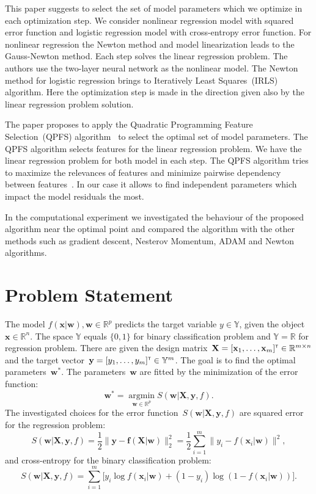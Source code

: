 \documentclass[a4paper,12pt]{article}
\theoremstyle{plain} %
\theoremstyle{definition} %
\theoremstyle{remark} %
\newcommand{\bw}{\mathbf{w}}
\newcommand{\by}{\mathbf{y}}
\newcommand{\bx}{\mathbf{x}}
\newcommand{\bbR}{\mathbb{R}}
\newcommand{\bbY}{\mathbb{Y}}
\newcommand{\bX}{\mathbf{X}}
\newcommand{\T}{{\text{\tiny\sffamily\upshape\mdseries T}}}
\newcommand{\argmin}{\mathop{\arg \min}\limits}
\begin{document}
	This paper suggests to select the set of model parameters which we optimize in each optimization step.
	We consider nonlinear regression model with squared error function and logistic regression model with cross-entropy error function.
	For nonlinear regression the Newton method and model linearization leads to the Gauss-Newton method. 
	Each step solves the linear regression problem. 
	The authors use the two-layer neural network as the nonlinear model. 
	The Newton method for logistic regression brings to Iteratively Least Squares~(IRLS) algorithm. 
	Here the optimization step is made in the direction given also by the linear regression problem solution.
	
	The paper proposes to apply the Quadratic Programming Feature Selection~(QPFS) algorithm~\cite{katrutsa2017comprehensive,rodriguez2010qpfs} to select the optimal set of model parameters. The QPFS algorithm selects features for the linear regression problem. We have the linear regression problem for both model in each step. The QPFS algorithm tries to maximize the relevances of features and minimize pairwise dependency between features~\cite{ding2005mrmr}. In our case it allows to find independent parameters which impact the model residuals the most.
	
	In the computational experiment we investigated the behaviour of the proposed algorithm near the optimal point and compared the algorithm with the other methods such as gradient descent, Nesterov Momentum, ADAM and Newton algorithms. 
	
		
	\section*{Problem Statement}

	The model $f( \bx | \bw), \bw \in \mathbb{R}^p$ predicts the target variable $y \in \bbY$, given the object $\bx \in \bbR^{n}$. The space $\bbY$ equals $\{0, 1\}$ for binary classification problem and $\bbY = \bbR$ for regression problem.
	There are given the design matrix~$\bX = [\bx_1, \dots, \bx_m]^{\T} \in \bbR^{m \times n}$ and the target vector~$\by = [y_1, \dots, y_m]^{\T} \in \bbY^{m}$. 
	The goal is to find the optimal parameters~$\bw^*$.
	The parameters~$\bw$ are fitted by the minimization of the error function:
	\begin{equation}
		\bw^* = \argmin_{\bw \in \bbR^p} S(\bw | \bX, \by, f).
		\label{eq:error_function}
	\end{equation}
	The investigated choices for the error function~$S(\bw | \bX, \by, f)$ are
	squared error for the regression problem: 
		\begin{equation}
			S(\bw | \bX, \by, f) = \frac 12 \| \by - \mathbf{f}(\bX | \bw) \|_2^2 = \frac 12 \sum_{i=1}^m \| y_i - f(\bx_i | \bw)\|^2,
			\label{eq:squared_error}
		\end{equation}
	 and cross-entropy for the binary classification problem: 
		\begin{equation}
			S(\bw | \bX, \by, f) = \sum_{i=1}^m \bigl[y_i \log f (\bx_i | \bw) + (1-y_i) \log (1 - f (\bx_i | \bw))\bigr].
			\label{eq:log_loss}
		\end{equation}
	
\end{document}
